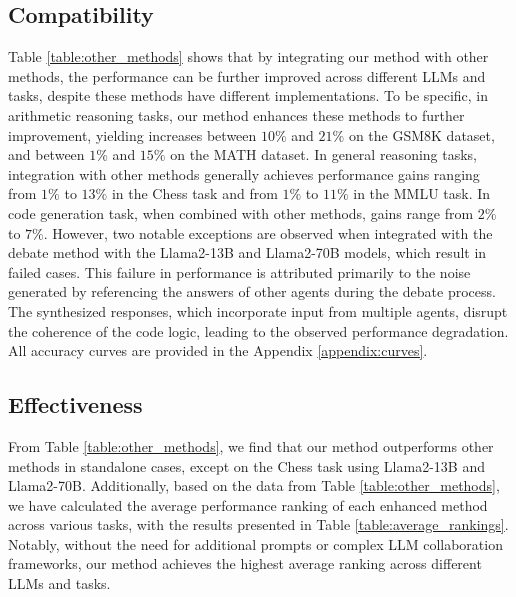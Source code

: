 \subsection{Compatibility}

Table \ref{table:other_methods} shows that by integrating our method with other methods, the performance can be further improved across different LLMs and tasks, despite these methods have different implementations. To be specific, in arithmetic reasoning tasks, our method enhances these methods to further improvement, yielding increases between $10\%$ and $21\%$ on the GSM8K dataset, and between $1\%$ and $15\%$ on the MATH dataset. In general reasoning tasks, integration with other methods generally achieves performance gains ranging from $1\%$ to $13\%$ in the Chess task and from $1\%$ to $11\%$ in the MMLU task. In code generation task, when combined with other methods, gains range from $2\%$ to $7\%$. However, two notable exceptions are observed when integrated with the debate method with the Llama2-13B and Llama2-70B models, which result in failed cases. This failure in performance is attributed primarily to the noise generated by referencing the answers of other agents during the debate process. The synthesized responses, which incorporate input from multiple agents, disrupt the coherence of the code logic, leading to the observed performance degradation. All accuracy curves are provided in the Appendix \ref{appendix:curves}.

\subsection{Effectiveness}
From Table \ref{table:other_methods}, we find that our method outperforms other methods in standalone cases, except on the Chess task using Llama2-13B and Llama2-70B. Additionally, based on the data from Table \ref{table:other_methods}, we have calculated the average performance ranking of each enhanced method across various tasks, with the results presented in Table \ref{table:average_rankings}. Notably, without the need for additional prompts or complex LLM collaboration frameworks, our method achieves the highest average ranking across different LLMs and tasks.


